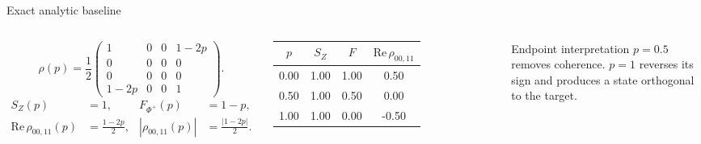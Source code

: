 \documentclass[10pt,aspectratio=169]{beamer}
\newcommand{\sourcefoot}[1]{}
\begin{document}
\begin{frame}[t]{Exact analytic baseline}
\begin{columns}[T]
\[
\rho(p)=\frac12\begin{pmatrix}
1&0&0&1-2p\\0&0&0&0\\0&0&0&0\\1-2p&0&0&1
\end{pmatrix}.
\]
\begin{align*}
S_Z(p)&=1, & F_{\Phi^+}(p)&=1-p,\\
\mathrm{Re}\,\rho_{00,11}(p)&=\frac{1-2p}{2}, &
|\rho_{00,11}(p)|&=\frac{|1-2p|}{2}.
\end{align*}
\begin{tabular}{@{}cccc@{}}
\toprule
$p$ & $S_Z$ & $F$ & $\mathrm{Re}\,\rho_{00,11}$\\
\midrule
0.00 & 1.00 & 1.00 & 0.50\\
0.50 & 1.00 & 0.50 & 0.00\\
1.00 & 1.00 & 0.00 & -0.50\\
\bottomrule
\end{tabular}
\vspace{3mm}
\begin{block}{Endpoint interpretation}
$p=0.5$ removes coherence. $p=1$ reverses its sign and produces a state orthogonal to the target.
\end{block}
\end{columns}
\sourcefoot{Values from \texttt{experiments/phase\_error\_sweep.csv}; formulas in \texttt{paper/main.tex}.}
\end{frame}
\end{document}
